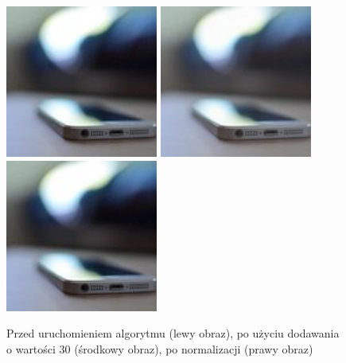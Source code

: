\documentclass[a4paper,12pt]{book}
\begin{document}
\begin{figure}[H]
	\caption{Przed uruchomieniem algorytmu (lewy obraz), po użyciu dodawania o wartości 30 (środkowy obraz), po normalizacji (prawy obraz)}
	\includegraphics[width=5cm, height=5cm]{phone-unmodified.jpg}
	\includegraphics[width=5cm, height=5cm]{3-1/sum-color-const-phone-30.png}
	\includegraphics[width=5cm, height=5cm]{3-1/sum-color-const-phone-30-norm.png}
\end{figure}
\end{document}
